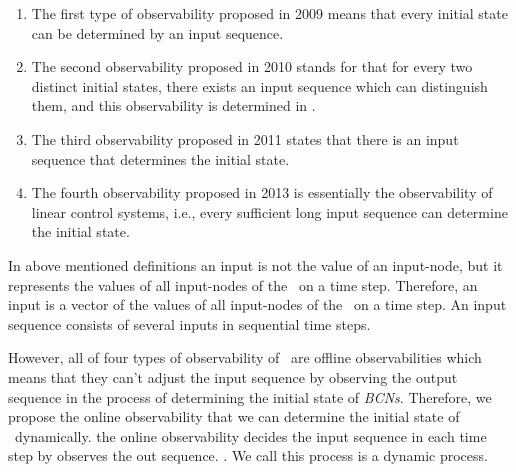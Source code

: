 \begin{enumerate}
	\item The first type of observability proposed in 2009 \cite{cheng2009controllability} means that every initial state can be determined by an input sequence.
	
	\item 
	The second observability proposed in 2010 \cite{Zhao2010Input} stands for that for every two distinct initial states, there exists an input sequence which can distinguish them, and this observability is determined in \cite{Li2015Controllability}.
	
	\item The third observability proposed in 2011 \cite{Cheng2011Identification} states that there is an input sequence that determines the initial state.
	
	\item  The fourth observability proposed in 2013 \cite{Fornasini2013Observability} is essentially the observability of linear control systems, i.e., every sufficient long input sequence can determine the initial state.
\end{enumerate}
 


In above mentioned definitions an input is not the value of an input-node, but it represents the values of all input-nodes of the \BCN\ on a time step. Therefore, an input is a vector of the values of all input-nodes of the \BCN\ on a time step. An input sequence consists of several inputs in sequential time steps.
 
 However, all of four  types of observability of \BCNs\ are offline observabilities which means that they can't adjust the input sequence by observing the output sequence in the process of determining the initial state of {\em BCNs}. Therefore, we propose the online observability that we can determine the initial state of \BCNs\ dynamically.   the online observability decides the input sequence in each time step by observes the out sequence. . We call this process is a dynamic process. 
